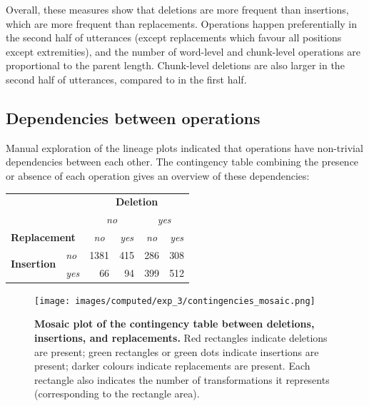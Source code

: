 \documentclass[a4paper,fleqn]{cas-dc}
\begin{document}
Overall, these measures show that deletions are more frequent than
insertions, which are more frequent than replacements. Operations happen
preferentially in the second half of utterances (except replacements
which favour all positions except extremities), and the number of
word-level and chunk-level operations are proportional to the parent
length. Chunk-level deletions are also larger in the second half of
utterances, compared to in the first half.

\subsection{Dependencies between
operations}\label{dependencies-between-operations}

Manual exploration of the lineage plots indicated that operations have
non-trivial dependencies between each other. The contingency table
combining the presence or absence of each operation gives an overview of
these dependencies:

\begin{center}
  \begin{tabular}{llrrrr}
    \toprule
     & & \multicolumn{4}{c}{\textbf{Deletion}} \\
    \cmidrule(l){3-6}
     & & \multicolumn{2}{c}{\emph{no}} & \multicolumn{2}{c}{\emph{yes}} \\
    \cmidrule(lr){3-4} \cmidrule(l){5-6}
    \multicolumn{2}{l}{\textbf{Replacement}} & \multicolumn{1}{c}{\emph{no}} & \multicolumn{1}{c}{\emph{yes}} & \multicolumn{1}{c}{\emph{no}} & \multicolumn{1}{c}{\emph{yes}} \\
    \midrule
    \multirow{2}{*}{\textbf{Insertion}} & \emph{no} & 1381 & 415 & 286 & 308 \\
     & \emph{yes} & 66 & 94 & 399 & 512 \\
    \bottomrule
  \end{tabular}
\end{center}

\begin{figure}
  \centering
  \texttt{[image: images/computed/exp\_3/contingencies\_mosaic.png]}
  \caption[Mosaic plot of the contingency table between deletions, insertions, and replacements]{
  \textbf{Mosaic plot of the contingency table between deletions, insertions, and replacements.}
  Red rectangles indicate deletions are present;
  green rectangles or green dots indicate insertions are present;
  darker colours indicate replacements are present.
  Each rectangle also indicates the number of transformations it represents (corresponding to the rectangle area).
  }
  \label{fig:gistr-contingencies}
\end{figure}
\end{document}
